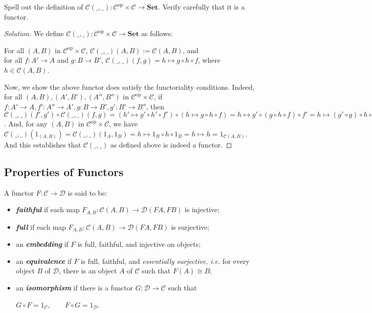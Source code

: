 \documentclass[]{amsbook}
\newcommand{\qq}{\qquad}
\newcommand{\catname}[1]{\mathbf{#1}}
\newcommand{\0}{\mathbf{0}}
\newcommand{\1}{\mathbf{1}}
\newcommand{\mc}[1]{\mathcal{#1}}
\newenvironment{solution}
    {\begin{proof}[Solution]}{\end{proof}}
\begin{document}
\setcounter{Exercise}{46}
\begin{Exercise}
    Spell out the definition of $\mc{C}(\_, \_): \mc{C}^{\text{op}} \times
    \mc{C} \to \catname{Set}$. Verify carefully that it is a functor.
\end{Exercise}
\begin{solution}
    We define $\mc{C}(\_, \_): \mc{C}^{\text{op}} \times \mc{C} \to
    \catname{Set}$ as follows:
    \begin{center}
        For all $(A, B)$ in $\mc{C}^{\text{op}} \times \mc{C}$, $\mc{C}(\_,\_)
        (A, B) := \mc{C}(A, B)$, and \\
        for all $f: A' \to A$ and $g: B \to B'$, $\mc{C}(\_, \_)(f, g) =
        h \mapsto g \circ h \circ f$, where $h \in \mc{C}(A, B)$.
    \end{center}
    Now, we show the above functor does satisfy the functoriality conditions.
    Indeed, for all $(A, B), (A', B'), (A'', B'')$ in $\mc{C}^{\text{op}}
    \times \mc{C}$, if $f: A' \to A, f': A'' \to A', g: B \to B', g': B' \to
    B''$, then $\mc{C}(\_,\_)(f', g')
    \circ \mc{C}(\_,\_)(f, g) = (h' \mapsto g' \circ h' \circ f') \circ
    (h \mapsto g \circ h \circ f) = h \mapsto g' \circ (g \circ h \circ f)
    \circ f' = h \mapsto (g' \circ g) \circ h \circ (f \circ f') = \mc{C}(\_,
    \_)(f \circ f', g' \circ g)$. And, for any $(A, B)$ in $\mc{C}^{\text{op}}
    \times \mc{C}$, we have $\mc{C}(\_, \_)(1_{(A, B)}) = \mc{C}(\_, \_)
    (1_A, 1_B) = h \mapsto 1_B \circ h \circ 1_B = h \mapsto h = 1_{\mc{C}
    (A, B)}$. And this establishes that $\mc{C}(\_, \_)$ as defined above is
    indeed a functor.
\end{solution}

\subsection*{Properties of Functors}
A functor $F: \mc{C} \to \mc{D}$ is said to be:
\begin{itemize}
    \item \emph{\textbf{faithful}} if each map $F_{A, B}: \mc{C}(A, B) \to
    \mc{D}(FA, FB)$ is injective;

    \item \emph{\textbf{full}} if each map $F_{A, B}: \mc{C}(A, B) \to
    \mc{D}(FA, FB)$ is surjective;

    \item an \emph{\textbf{embedding}} if $F$ is full, faithful, and injective
    on objects;

    \item an \emph{\textbf{equivalence}} if $F$ is full, faithful, and
    \emph{essentially surjective, i.e.} for every object $B$ of $\mc{D}$, there
    is an object $A$ of $\mc{C}$ such that $F(A) \cong B$;

    \item an \emph{\textbf{isomorphism}} if there is a functor $G: \mc{D} \to
    \mc{C}$ such that
    \begin{center}
        $G \circ F = 1_{\mc{C}}, \qq F \circ G = 1_{\mc{D}}$.
    \end{center}
\end{itemize}
\end{document}
